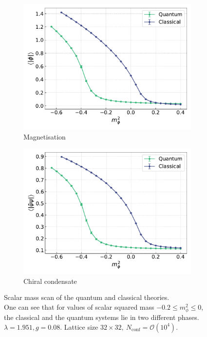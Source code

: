 \begin{figure}[h]
    \centering
    \captionsetup[subfigure]{justification=centering}
    \begin{subfigure}[t]{0.47\textwidth}
        \centering
        \includegraphics[width=1.0\textwidth]{figures/chiral_PT/mass_scan/magnetisation.pdf}
        \caption{Magnetisation}
    \end{subfigure}
    \hfill
    \begin{subfigure}[t]{0.47\textwidth}
        \centering
        \includegraphics[width=1.0\textwidth]{figures/chiral_PT/mass_scan/condensate.pdf}
        \caption{Chiral condensate}
    \end{subfigure}
    \caption[Scalar mass scan of the quantum and classical theories]{Scalar mass scan of the quantum and classical theories. \\ One can see that for values of scalar squared mass $-0.2 \leq m_\phi^2 \leq 0$, the classical and the quantum systems lie in two different phases. \\
    $\lambda=1.951, g=0.08$. Lattice size $32 \times 32, \ N_\text{conf} = \mathcal{O}(10^4)$.}
    \label{fig:scans_classical_quantum}
\end{figure} \\
